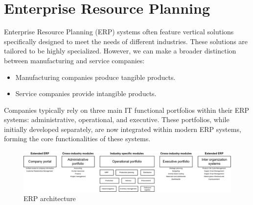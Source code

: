 \section{Enterprise Resource Planning}

Enterprise Resource Planning (ERP) systems often feature vertical solutions specifically designed to meet the needs of different industries. 
These solutions are tailored to be highly specialized.
However, we can make a broader distinction between manufacturing and service companies:
\begin{itemize}
    \item Manufacturing companies produce tangible products.
    \item Service companies provide intangible products.
\end{itemize}
\noindent 
Companies typically rely on three main IT functional portfolios within their ERP systems: administrative, operational, and executive. 
These portfolios, while initially developed separately, are now integrated within modern ERP systems, forming the core functionalities of these systems.

\begin{figure}[H]
    \centering
    \includegraphics[width=1\linewidth]{images/bis1.png}
    \caption{ERP architecture}
\end{figure}